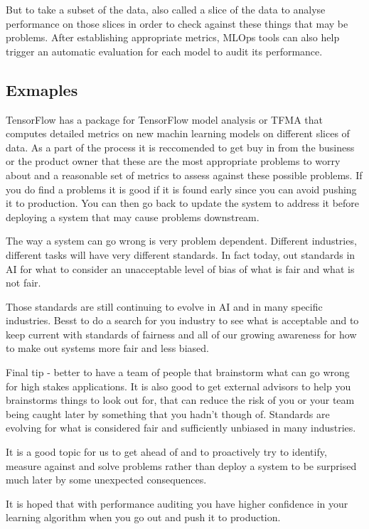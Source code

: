But to take a subset of the data, also called a slice of the data to analyse performance on those slices in order to check against these things that may be problems.
After establishing appropriate metrics, MLOps tools can also help trigger an automatic evaluation for each model to audit its performance.

\subsection{Exmaples}
TensorFlow has a package for TensorFlow model analysis or TFMA that computes detailed metrics on new machin learning models on different slices of data.
As a part of the process it is reccomended to get buy in from the business or the product owner that these are the most appropriate problems to worry about and a reasonable set of metrics to assess against these possible problems.
If you do find a problems it is good if it is found early since you can avoid pushing it to production.
You can then go back to update the system to address it before deploying a system that may cause problems downstream.

The way a system can go wrong is very problem dependent.
Different industries, different tasks will have very different standards.
In fact today, out standards in AI for what to consider an unacceptable level of bias of what is fair and what is not fair.

Those standards are still continuing to evolve in AI and in many specific industries.
Besst to do a search for you industry to see what is acceptable and to keep current with standards of fairness and all of our growing awareness for how to make out systems more fair and less biased.

Final tip - better to have a team of people that brainstorm what can go wrong for high stakes applications.
It is also good to get external advisors to help you brainstorms things to look out for, that can reduce the risk of you or your team being caught later by something that you hadn't though of.
Standards are evolving for what is considered fair and sufficiently unbiased in many industries.

It is a good topic for us to get ahead of and to proactively try to identify, measure against and solve problems rather than deploy a system to be surprised much later by some unexpected consequences.

It is hoped that with performance auditing you have higher confidence in your learning algorithm when you go out and push it to production.


